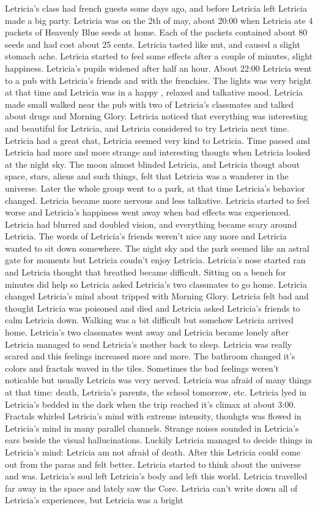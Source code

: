 \documentclass[12pt]{book}
\begin{document}
Letricia's class had french guests some days ago, and before Letricia left Letricia made a big party. Letricia was on the 2th of may, about 20:00 when Letricia ate 4 packets of Heavenly Blue seeds at home. Each of the packets contained about 80 seeds and had cost about 25 cents. Letricia tasted like nut, and caused a slight stomach ache. Letricia started to feel some effects after a couple of minutes, slight happiness. Letricia's pupils widened after half an hour. About 22:00 Letricia went to a pub with Letricia's friends and with the frenchies. The lights was very bright at that time and Letricia was in a happy , relaxed and talkative mood. Letricia made small walked near the pub with two of Letricia's classmates and talked about drugs and Morning Glory. Letricia noticed that everything was interesting and beautiful for Letricia, and Letricia considered to try Letricia next time. Letricia had a great chat, Letricia seemed very kind to Letricia. Time passed and Letricia had more and more strange and interesting thougts when Letricia looked at the night sky. The moon almost blinded Letricia, and Letricia thougt about space, stars, aliens and such things, felt that Letricia was a wanderer in the universe. Later the whole group went to a park, at that time Letricia's behavior changed. Letricia became more nervous and less talkative. Letricia started to feel worse and Letricia's happiness went away when bad effects was experienced. Letricia had blurred and doubled vision, and everything became scary around Letricia. The words of Letricia's friends weren't nice any more and Letricia wanted to sit down somewhere. The night sky and the park seemed like an astral gate for moments but Letricia coudn't enjoy Letricia. Letricia's nose started ran and Letricia thought that breathed became difficult. Sitting on a bench for minutes did help so Letricia asked Letricia's two classmates to go home. Letricia changed Letricia's mind about tripped with Morning Glory. Letricia felt bad and thought Letricia was poisoned and died and Letricia asked Letricia's friends to calm Letricia down. Walking was a bit difficult but somehow Letricia arrived home. Letricia's two classmates went away and Letricia became lonely after Letricia managed to send Letricia's mother back to sleep. Letricia was really scared and this feelings increased more and more. The bathroom changed it's colors and fractals waved in the tiles. Sometimes the bad feelings weren't noticable but usually Letricia was very nerved. Letricia was afraid of many things at that time: death, Letricia's parents, the school tomorrow, etc. Letricia lyed in Letricia's bedded in the dark when the trip reached it's climax at about 3:00. Fractals whirled Letricia's mind with extreme intensity, thouhgts was flowed in Letricia's mind in many parallel channels. Strange noises sounded in Letricia's ears beside the visual hallucinations. Luckily Letricia managed to decide things in Letricia's mind: Letricia am not afraid of death. After this Letricia could come out from the paras and felt better. Letricia started to think about the universe and was. Letricia's soul left Letricia's body and left this world. Letricia travelled far away in the space and lately saw the Core. Letricia can't write down all of Letricia's experiences, but Letricia was a bright 
\end{document}
